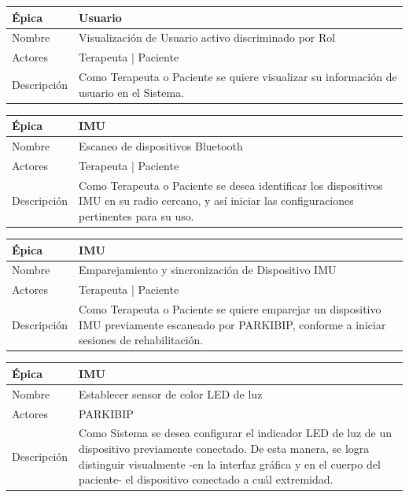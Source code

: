 \begin{table}[H] 
\centering
\begin{tabular}{| p{2cm} | p{10cm} |}
\hline
Épica & Usuario\\ \hline
Nombre & Visualización de Usuario activo discriminado por Rol\\ \hline
Actores & Terapeuta | Paciente\\ \hline
Descripción &  Como Terapeuta o Paciente se quiere visualizar su información de usuario en el Sistema.\\ \hline
\end{tabular}
\end{table}

\begin{table}[H] 
\centering
\begin{tabular}{| p{2cm} | p{10cm} |}
\hline
Épica & IMU\\ \hline
Nombre & Escaneo de dispositivos Bluetooth\\ \hline
Actores & Terapeuta | Paciente\\ \hline
Descripción & Como Terapeuta o Paciente se desea identificar los dispositivos IMU en su radio cercano, y así iniciar las configuraciones pertinentes para su uso.\\ \hline
\end{tabular}
\end{table}

\begin{table}[H] 
\centering
\begin{tabular}{| p{2cm} | p{10cm} |}
\hline
Épica & IMU\\ \hline
Nombre & Emparejamiento y sincronización de Dispositivo IMU\\ \hline
Actores & Terapeuta | Paciente\\ \hline
Descripción &  Como Terapeuta o Paciente se quiere emparejar un dispositivo IMU previamente escaneado por PARKIBIP, conforme a iniciar sesiones de rehabilitación.\\ \hline
\end{tabular}
\end{table}

\begin{table}[H] 
\centering
\begin{tabular}{| p{2cm} | p{10cm} |}
\hline
Épica & IMU\\ \hline
Nombre & Establecer sensor de color LED de luz\\ \hline
Actores & PARKIBIP\\ \hline
Descripción &  Como Sistema se desea configurar el indicador LED de luz de un dispositivo previamente conectado. De esta manera, se logra distinguir visualmente -en la interfaz gráfica y en el cuerpo del paciente- el dispositivo conectado a cuál extremidad.\\ \hline
\end{tabular}
\end{table}

